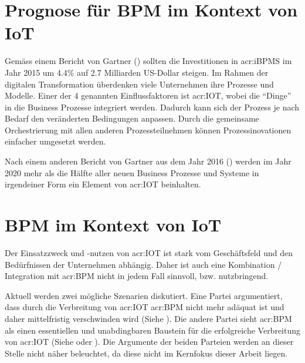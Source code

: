 \section{Prognose für BPM im Kontext von IoT}
Gemäss einem Bericht von Gartner (\cite{E:Gartner:BPM:2015}) sollten die Investitionen in \gls{acr:iBPMS} im Jahr 2015 um 4.4\% auf 2.7 Milliarden US-Dollar steigen. Im Rahmen der digitalen Transformation überdenken viele Unternehmen ihre Prozesse und Modelle. Einer der 4 genannten Einflussfaktoren ist \gls{acr:IOT}, wobei die "`Dinge"' in die Business Prozesse integriert werden. Dadurch kann sich der Prozess je nach Bedarf den veränderten Bedingungen anpassen. Durch die gemeinsame Orchestrierung mit allen anderen Prozessteilnehmen können Prozessinovationen einfacher umgesetzt werden.

Nach einem anderen Bericht von Gartner aus dem Jahr 2016 (\cite{E:Gartner:BPM:IOT:2020}) werden im Jahr 2020 mehr als die Hälfte aller neuen Business Prozesse und Systeme in irgendeiner Form ein Element von \gls{acr:IOT} beinhalten.


\section{BPM im Kontext von IoT}
Der Einsatzzweck und -nutzen von \gls{acr:IOT} ist stark vom Geschäftsfeld und den Bedürfnissen der Unternehmen abhängig. Daher ist auch eine Kombination / Integration mit \gls{acr:BPM} nicht in jedem Fall sinnvoll, bzw. nutzbringend.

Aktuell werden zwei mögliche Szenarien diskutiert. Eine Partei argumentiert, dass durch die Verbreitung von \gls{acr:IOT} \gls{acr:BPM} nicht mehr adäquat ist und daher mittelfristig verschwinden wird (Siehe \cite{E:LinkedIn:Herring:IOTBPM}). Die andere Partei sieht \gls{acr:BPM} als einen essentiellen und unabdingbaren Baustein für die erfolgreiche Verbreitung von \gls{acr:IOT} (Siehe \cite{E:DataInformed:IOTBPM} oder \cite{E:InformationAge:IOTBPM}). Die Argumente der beiden Parteien werden an dieser Stelle nicht näher beleuchtet, da diese nicht im Kernfokus dieser Arbeit liegen.


